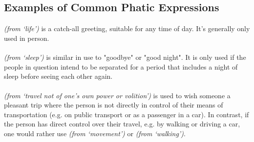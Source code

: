 \subsection*{Examples of Common Phatic Expressions}

\paragraph{} \textit{(from  `life')} is a catch-all greeting, suitable for any time of day. It's generally only used in person.

\paragraph{} \textit{(from  `sleep')} is similar in use to "goodbye" or "good night". It is only used if the people in question intend to be separated for a period that includes a night of sleep before seeing each other again.

\paragraph{} \textit{(from  `travel not of one's own power or volition')} is used to wish someone a pleasant trip where the person is not directly in control of their means of transportation (e.g. on public transport or as a passenger in a car). In contrast, if the person has direct control over their travel, e.g. by walking or driving a car, one would rather use \textbf{} \textit{(from  `movement')} or \textbf{} \textit{(from  `walking')}.